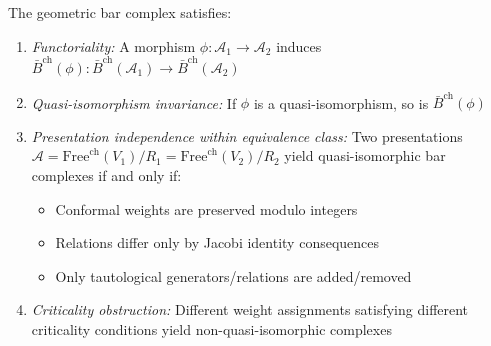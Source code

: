 \begin{theorem}\label{thm:presentation-independence}
 The geometric bar complex satisfies:
 \begin{enumerate}
 \item \emph{Functoriality:} A morphism $\phi: \mathcal{A}_1 \to \mathcal{A}_2$ induces
 $\bar{B}^{\text{ch}}(\phi): \bar{B}^{\text{ch}}(\mathcal{A}_1) \to \bar{B}^{\text{ch}}(\mathcal{A}_2)$

 \item \emph{Quasi-isomorphism invariance:} If $\phi$ is a quasi-isomorphism, so is $\bar{B}^{\text{ch}}(\phi)$

 \item \emph{Presentation independence within equivalence class:} Two presentations
 $\mathcal{A} = \text{Free}^{\text{ch}}(V_1)/R_1 = \text{Free}^{\text{ch}}(V_2)/R_2$
 yield quasi-isomorphic bar complexes if and only if:
 \begin{itemize}
 \item Conformal weights are preserved modulo integers
 \item Relations differ only by Jacobi identity consequences
 \item Only tautological generators/relations are added/removed
 \end{itemize}

 \item \emph{Criticality obstruction:} Different weight assignments satisfying different criticality
 conditions yield non-quasi-isomorphic complexes
 \end{enumerate}
 \end{theorem}

